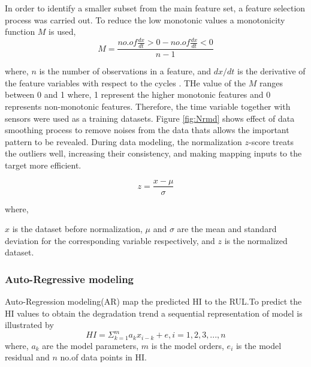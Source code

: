 In order to identify a smaller subset from the main feature set, a feature selection process was carried out. To reduce the low monotonic values
a monotonicity function $M$ is used,
\begin{equation}
    M=\frac{no.of \frac{dx}{dt}>0-no.of\frac{dx}{dt}<0}{n-1}
\end{equation}

where,
$n$ is the number of observations in a feature, and $dx/dt$ is the derivative of the feature variables with respect to the cycles
\cite{Mutunga2019HealthIndexBP}. THe value of the $M$ ranges between 0 and 1 where, 1 represent the higher monotonic features and 0 represents
non-monotonic features. Therefore, the time variable together with sensors were used as a training datasets. Figure \ref{fig:Nrmd} shows effect of
data smoothing process to remove noises from the data thats allows the important pattern to be revealed. During data modeling, the normalization
$z$-score treats the outliers well, increasing their consistency, and making mapping inputs to the target more efficient.

\begin{equation}
    z=\frac{x-\mu}{\sigma}
\end{equation}

where,

$x$ is the dataset before normalization, $\mu$ and $\sigma$ are the mean and standard deviation for the corresponding variable respectively, and
$z$ is the normalized dataset.

\subsubsection{Auto-Regressive modeling}

Auto-Regression modeling(AR) map the predicted HI to the RUL.To predict the HI values to obtain the degradation trend a sequential representation
of model is illustrated by
\begin{equation}
    HI=\Sigma_{k=1}^m a_k x_{i-k}+e, i=1,2,3,...,n
\end{equation}
where, $a_k$ are the model parameters, $m$ is the model orders, $e_i$ is the model residual and $n$ no.of data points in HI.

